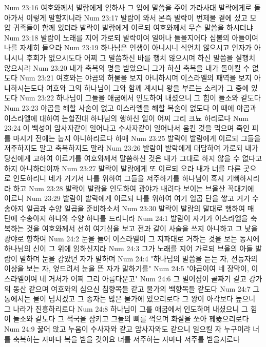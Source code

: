 Num 23:16  여호와께서 발람에게 임하사 그 입에 말씀을 주어 가라사대 발락에게로 돌아가서 이렇게 말할지니라
Num 23:17  발람이 와서 본즉 발락이 번제물 곁에 섰고 모압 귀족들이 함께 있더라 발락이 발람에게 이르되 여호와께서 무슨 말씀을 하시더냐
Num 23:18  발람이 노래를 지어 가로되 발락이여 일어나 들을지어다 십볼의 아들이여 나를 자세히 들으라
Num 23:19  하나님은 인생이 아니시니 식언치 않으시고 인자가 아니시니 후회가 없으시도다 어찌 그 말씀하신 바를 행치 않으시며 하신 말씀을 실행치 않으시랴
Num 23:20  내가 축복의 명을 받았으니 그가 하신 축복을 내가 돌이킬 수 없도다
Num 23:21  여호와는 야곱의 허물을 보지 아니하시며 이스라엘의 패역을 보지 아니하시는도다 여호와 그의 하나님이 그와 함께 계시니 왕을 부르는 소리가 그 중에 있도다
Num 23:22  하나님이 그들을 애굽에서 인도하여 내셨으니 그 힘이 들소와 같도다
Num 23:23  야곱을 해할 사술이 없고 이스라엘을 해할 복술이 없도다 이 때에 야곱과 이스라엘에 대하여 논할진대 하나님의 행하신 일이 어찌 그리 크뇨 하리로다
Num 23:24  이 백성이 암사자같이 일어나고 수사자같이 일어나서 움킨 것을 먹으며 죽인 피를 마시기 전에는 눕지 아니하리로다 하매
Num 23:25  발락이 발람에게 이르되 그들을 저주하지도 말고 축복하지도 말라
Num 23:26  발람이 발락에게 대답하여 가로되 내가 당신에게 고하여 이르기를 여호와께서 말씀하신 것은 내가 그대로 하지 않을 수 없다고 하지 아니하더이까
Num 23:27  발락이 발람에게 또 이르되 오라 내가 너를 다른 곳으로 인도하리니 네가 거기서 나를 위하여 그들을 저주하기를 하나님이 혹시 기뻐하시리라 하고
Num 23:28  발락이 발람을 인도하여 광야가 내려다 보이는 브올산 꼭대기에 이르니
Num 23:29  발람이 발락에게 이르되 나를 위하여 여기 일곱 단을 쌓고 거기 수송아지 일곱과 수양 일곱을 준비하소서
Num 23:30  발락이 발람의 말대로 행하여 매 단에 수송아지 하나와 수양 하나를 드리니라
Num 24:1  발람이 자기가 이스라엘을 축복하는 것을 여호와께서 선히 여기심을 보고 전과 같이 사술을 쓰지 아니하고 그 낯을 광야로 향하여
Num 24:2  눈을 들어 이스라엘이 그 지파대로 거하는 것을 보는 동시에 하나님의 신이 그 위에 임하신지라
Num 24:3  그가 노래를 지어 가로되 브올의 아들 발람이 말하며 눈을 감았던 자가 말하며
Num 24:4  "하나님의 말씀을 듣는 자, 전능자의 이상을 보는 자, 엎드려서 눈을 뜬 자가 말하기를"
Num 24:5  "야곱이여 네 장막이, 이스라엘이여 네 거처가 어찌 그리 아름다운고"
Num 24:6  그 벌어짐이 골짜기 같고 강가의 동산 같으며 여호와의 심으신 침향목들 같고 물가의 백향목들 같도다
Num 24:7  그 통에서는 물이 넘치겠고 그 종자는 많은 물가에 있으리로다 그 왕이 아각보다 높으니 그 나라가 진흥하리로다
Num 24:8  하나님이 그를 애굽에서 인도하여 내셨으니 그 힘이 들소와 같도다 그 적국을 삼키고 그들의 뼈를 꺽으며 화살을 쏘아 꿰뚫으리로다
Num 24:9  꿇어 앉고 누움이 수사자와 같고 암사자와도 같으니 일으킬 자 누구이랴 너를 축복하는 자마다 복을 받을 것이요 너를 저주하는 자마다 저주를 받을지로다
